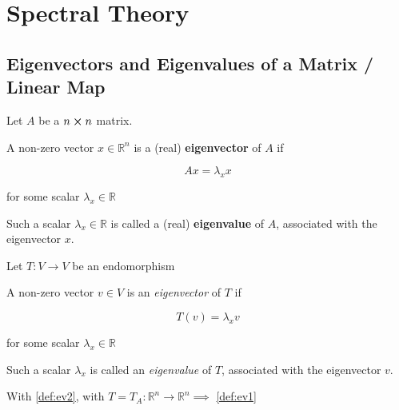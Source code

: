 \chapter{Spectral Theory}

\section{Eigenvectors and Eigenvalues of a Matrix / Linear Map}

\begin{definition}
	\label{def:ev1}
	Let $A$ be a $n \cross n$ matrix.

	A non-zero vector $x \in \mathbb{R}^n$ is a (real) \textbf{eigenvector} of $A$ if

	\begin{equation} \label{eq:ev-def}
		Ax = \lambda_x x
	\end{equation}

	for some scalar $\lambda_x \in \mathbb{R}$

	Such a scalar $\lambda_x \in \mathbb{R}$ is called a (real) \textbf{eigenvalue} of $A$, associated with the eigenvector $x$.
\end{definition}

\begin{definition}
	\label{def:ev2}
	Let $T:V \to V$ be an endomorphism

	A non-zero vector $v \in V$ is an \textit{eigenvector} of $T$ if

	\begin{equation} \label{eq:ev-def-2}
		T(v) = \lambda_x v
	\end{equation}

	for some scalar $\lambda_x \in \mathbb{R}$

	Such a scalar $\lambda_x$ is called an \textit{eigenvalue} of $T$, associated with the eigenvector $v$.
\end{definition}

\begin{remark}
	With \cref*{def:ev2}, with $T = T_A: \mathbb{R}^n \to \mathbb{R}^n \implies$ \cref*{def:ev1}
\end{remark}

